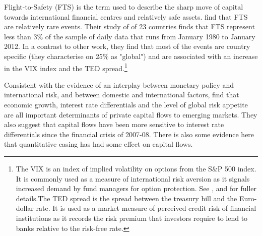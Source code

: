 \documentclass[12pt, a4paper, oneside]{article} %
\begin{document}
Flight-to-Safety (FTS) is the term used to describe the sharp move of capital towards international financial centres and relatively safe assets.\citet{FTS} find that FTS are relatively rare events. Their study of of 23 countries finds that FTS represent less than 3\% of the sample of daily data that runs from January 1980 to January 2012.  In a contrast to other work, they find that most of the events are country specific (they characterise on 25\% as "global") and are associated with an increase in the VIX index and the TED spread.\footnote{The VIX is an index of implied volatility on options from the S\&P 500 index.  It is commonly used as a measure of international risk aversion as it signals increased demand by fund managers for option protection.  See \citet{VIX}, \citet{GoldmanVol} and \citet{Diamond} for fuller details.The TED spread is the spread between the treasury bill and the Euro-dollar rate.  It is used as a market measure of perceived credit risk of financial institutions as it records the risk premium that investors require to lend to banks relative to the risk-free rate.}   %


Consistent with the evidence of an interplay between monetary policy and international risk, and between domestic and international factors, \citet{Ahmed2014} find that economic growth, interest rate differentials and the level of global risk appetite are all important determinants of private capital flows to emerging markets.  They also suggest that capital flows have been more sensitive to interest rate differentials since the financial crisis of 2007-08. There is also some evidence here that quantitative easing has had some effect on capital flows. 
\end{document}
